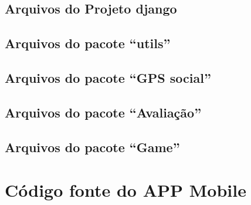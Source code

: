 \section{Arquivos do Projeto \gls{django}}


\clearpage
\section{Arquivos do pacote ``utils''}





\section{Arquivos do pacote ``GPS social''}




\clearpage
\section{Arquivos do pacote ``Avaliação''}




\clearpage
\section{Arquivos do pacote ``Game''}





\chapter{Código fonte do APP Mobile}\label{anexo:sources-mobile}
